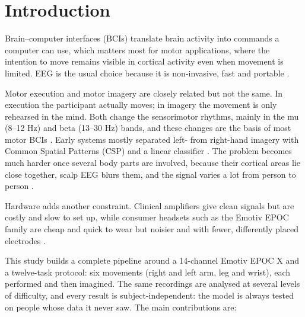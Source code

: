 \documentclass[pdflatex,sn-mathphys-num]{sn-jnl}%
\theoremstyle{thmstyleone}%
\theoremstyle{thmstyletwo}%
\theoremstyle{thmstylethree}%
\begin{document}
\section{Introduction}\label{sec1}

Brain--computer interfaces (BCIs) translate brain activity into commands a computer can use, which matters most for motor applications, where the intention to move remains visible in cortical activity even when movement is limited. EEG is the usual choice because it is non-invasive, fast and portable \citep{Wolpaw2002}.

Motor execution and motor imagery are closely related but not the same. In execution the participant actually moves; in imagery the movement is only rehearsed in the mind. Both change the sensorimotor rhythms, mainly in the mu (8--12 Hz) and beta (13--30 Hz) bands, and these changes are the basis of most motor BCIs \citep{Pfurtscheller2001}. Early systems mostly separated left- from right-hand imagery with Common Spatial Patterns (CSP) and a linear classifier \citep{Ramoser2000,Blankertz2008}. The problem becomes much harder once several body parts are involved, because their cortical areas lie close together, scalp EEG blurs them, and the signal varies a lot from person to person \citep{Lotte2018}.

Hardware adds another constraint. Clinical amplifiers give clean signals but are costly and slow to set up, while consumer headsets such as the Emotiv EPOC family are cheap and quick to wear but noisier and with fewer, differently placed electrodes \citep{Badcock2013}.

This study builds a complete pipeline around a 14-channel Emotiv EPOC X and a twelve-task protocol: six movements (right and left arm, leg and wrist), each performed and then imagined. The same recordings are analysed at several levels of difficulty, and every result is subject-independent: the model is always tested on people whose data it never saw. The main contributions are:
\end{document}
